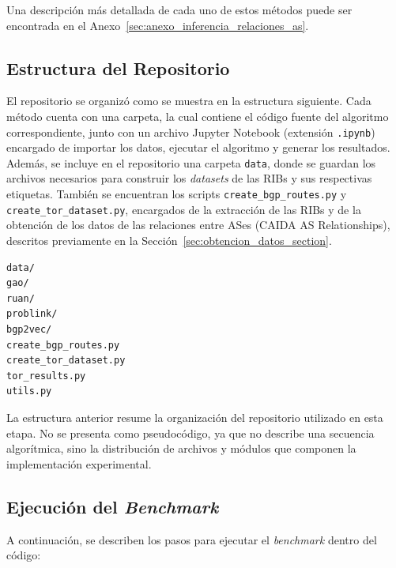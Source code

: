 Una descripción más detallada de cada uno de estos métodos puede ser encontrada en el Anexo~\ref{sec:anexo_inferencia_relaciones_as}.\\

\subsection{Estructura del Repositorio}

El repositorio se organizó como se muestra en la estructura siguiente. Cada método cuenta con una carpeta, la cual contiene el código fuente del algoritmo correspondiente, junto con un archivo Jupyter Notebook (extensión \texttt{.ipynb}) encargado de importar los datos, ejecutar el algoritmo y generar los resultados. Además, se incluye en el repositorio una carpeta \texttt{data}, donde se guardan los archivos necesarios para construir los \textit{datasets} de las RIBs y sus respectivas etiquetas. También se encuentran los scripts \texttt{create\_bgp\_routes.py} y \texttt{create\_tor\_dataset.py}, encargados de la extracción de las RIBs y de la obtención de los datos de las relaciones entre ASes (CAIDA AS Relationships), descritos previamente en la Sección~\ref{sec:obtencion_datos_section}.



\begin{verbatim}
data/
gao/
ruan/
problink/
bgp2vec/
create_bgp_routes.py
create_tor_dataset.py
tor_results.py
utils.py
\end{verbatim}
La estructura anterior resume la organización del repositorio utilizado en esta etapa. No se presenta como pseudocódigo, ya que no describe una secuencia algorítmica, sino la distribución de archivos y módulos que componen la implementación experimental.




\subsection{Ejecución del \textit{Benchmark}}

A continuación, se describen los pasos para ejecutar el \textit{benchmark} dentro del código:


